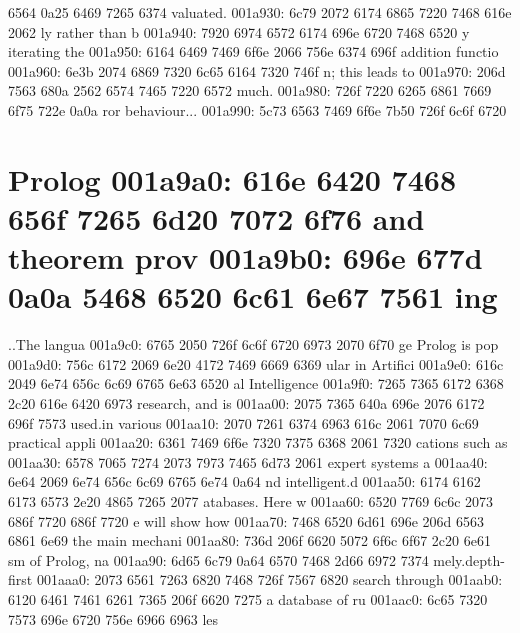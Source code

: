 \begin{bo
00010e0: 7865 647d 5c62 6567 696e 7b76 6572 6261  xed}
\begin{verba
00010f0: 7469 6d7d 0a20 2023 7479 7065 2074 6572  tim}
\begin{
0001c40: 7665 7262 6174 696d 7d0a 2020 236c 6574  verbatim}
\begin{boxe
00027a0: 647d 5c62 6567 696e 7b76 6572 6261 7469  d}
\begin{verbati
00027b0: 6d7d 0a20 2023 6c65 7420 696e 6669 7865  m}
\begin{v
0002c60: 6572 6261 7469 6d7d 0a20 2023 6c65 7420  erbatim}
\begin{
0002dc0: 7665 7262 6174 696d 7d0a 2020 236c 6574  verbatim}
\begin{boxed
0002f30: 7d5c 6265 6769 6e7b 7665 7262 6174 696d  }
\begin{verbatim
0002f40: 7d0a 2020 236c 6574 2068 6428 683a 3a74  }
\begin{v
0003e60: 6572 6261 7469 6d7d 0a20 2023 236f 7065  erbatim}
\begin{boxed
00042b0: 7d5c 6265 6769 6e7b 7665 7262 6174 696d  }
\begin{verbatim
00042c0: 7d0a 2020 2328 782c 7429 3b3b 0a20 202d  }
\begin{box
000a870: 6564 7d5c 6265 6769 6e7b 6c73 746c 6973  ed}
\begin{lstlis
000a880: 7469 6e67 7d0a 2020 6578 6365 7074 696f  ting}
\begin{verb
000ade0: 6174 696d 7d0a 2020 6c65 7420 7265 6320  atim}
\begin{boxed
000c0b0: 7d5c 6265 6769 6e7b 6c73 746c 6973 7469  }
\begin{lstlisti
000c0c0: 6e67 7d0a 2020 6c65 7420 7061 7273 6572  ng}
\begin{lstl
0014610: 6973 7469 6e67 7d0a 2020 6c65 7420 7265  isting}
\begin{ls
0015df0: 746c 6973 7469 6e67 7d0a 2020 6c65 7420  tlisting}
\begin{lstlistin
00176e0: 677d 0a20 206c 6574 206d 7364 203d 0a20  g}
6564 0a25 6469 7265 6374  valuated.%
001a930: 6c79 2072 6174 6865 7220 7468 616e 2062  ly rather than b
001a940: 7920 6974 6572 6174 696e 6720 7468 6520  y iterating the 
001a950: 6164 6469 7469 6f6e 2066 756e 6374 696f  addition functio
001a960: 6e3b 2074 6869 7320 6c65 6164 7320 746f  n; this leads to
001a970: 206d 7563 680a 2562 6574 7465 7220 6572   much.%
001a980: 726f 7220 6265 6861 7669 6f75 722e 0a0a  ror behaviour...
001a990: 5c73 6563 7469 6f6e 7b50 726f 6c6f 6720  \section{Prolog 
001a9a0: 616e 6420 7468 656f 7265 6d20 7072 6f76  and theorem prov
001a9b0: 696e 677d 0a0a 5468 6520 6c61 6e67 7561  ing}..The langua
001a9c0: 6765 2050 726f 6c6f 6720 6973 2070 6f70  ge Prolog is pop
001a9d0: 756c 6172 2069 6e20 4172 7469 6669 6369  ular in Artifici
001a9e0: 616c 2049 6e74 656c 6c69 6765 6e63 6520  al Intelligence 
001a9f0: 7265 7365 6172 6368 2c20 616e 6420 6973  research, and is
001aa00: 2075 7365 640a 696e 2076 6172 696f 7573   used.in various
001aa10: 2070 7261 6374 6963 616c 2061 7070 6c69   practical appli
001aa20: 6361 7469 6f6e 7320 7375 6368 2061 7320  cations such as 
001aa30: 6578 7065 7274 2073 7973 7465 6d73 2061  expert systems a
001aa40: 6e64 2069 6e74 656c 6c69 6765 6e74 0a64  nd intelligent.d
001aa50: 6174 6162 6173 6573 2e20 4865 7265 2077  atabases. Here w
001aa60: 6520 7769 6c6c 2073 686f 7720 686f 7720  e will show how 
001aa70: 7468 6520 6d61 696e 206d 6563 6861 6e69  the main mechani
001aa80: 736d 206f 6620 5072 6f6c 6f67 2c20 6e61  sm of Prolog, na
001aa90: 6d65 6c79 0a64 6570 7468 2d66 6972 7374  mely.depth-first
001aaa0: 2073 6561 7263 6820 7468 726f 7567 6820   search through 
001aab0: 6120 6461 7461 6261 7365 206f 6620 7275  a database of ru
001aac0: 6c65 7320 7573 696e 6720 756e 6966 6963  les 
\end{lstlistin
00176e0: 677d 0a20 206c 6574 206d 7364 203d 0a20  g}
\end{ls
0015df0: 746c 6973 7469 6e67 7d0a 2020 6c65 7420  tlisting}
\end{lstl
0014610: 6973 7469 6e67 7d0a 2020 6c65 7420 7265  isting}
\end{lstlisti
000c0c0: 6e67 7d0a 2020 6c65 7420 7061 7273 6572  ng}
\end{boxed
000c0b0: 7d5c 6265 6769 6e7b 6c73 746c 6973 7469  }
\end{verb
000ade0: 6174 696d 7d0a 2020 6c65 7420 7265 6320  atim}
\end{lstlis
000a880: 7469 6e67 7d0a 2020 6578 6365 7074 696f  ting}
\end{box
000a870: 6564 7d5c 6265 6769 6e7b 6c73 746c 6973  ed}
\end{verbatim
00042c0: 7d0a 2020 2328 782c 7429 3b3b 0a20 202d  }
\end{boxed
00042b0: 7d5c 6265 6769 6e7b 7665 7262 6174 696d  }
\end{v
0003e60: 6572 6261 7469 6d7d 0a20 2023 236f 7065  erbatim}
\end{verbatim
0002f40: 7d0a 2020 236c 6574 2068 6428 683a 3a74  }
\end{boxed
0002f30: 7d5c 6265 6769 6e7b 7665 7262 6174 696d  }
\end{
0002dc0: 7665 7262 6174 696d 7d0a 2020 236c 6574  verbatim}
\end{v
0002c60: 6572 6261 7469 6d7d 0a20 2023 6c65 7420  erbatim}
\end{verbati
00027b0: 6d7d 0a20 2023 6c65 7420 696e 6669 7865  m}
\end{boxe
00027a0: 647d 5c62 6567 696e 7b76 6572 6261 7469  d}
\end{
0001c40: 7665 7262 6174 696d 7d0a 2020 236c 6574  verbatim}
\end{verba
00010f0: 7469 6d7d 0a20 2023 7479 7065 2074 6572  tim}
\end{bo
00010e0: 7865 647d 5c62 6567 696e 7b76 6572 6261  xed}
